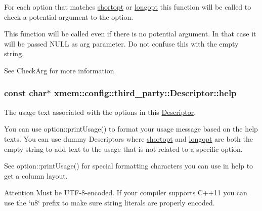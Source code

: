 For each option that matches \hyperlink{structxmem_1_1config_1_1third__party_1_1_descriptor_ac2dfb6bb8ca2f4aabf964a910cf0d59b}{shortopt} or \hyperlink{structxmem_1_1config_1_1third__party_1_1_descriptor_a7246a4bfc669f68bb406dece398be7bb}{longopt} this function will be called to check a potential argument to the option. 

This function will be called even if there is no potential argument. In that case it will be passed {\ttfamily N\+U\+L\+L} as {\ttfamily arg} parameter. Do not confuse this with the empty string.

See Check\+Arg for more information. \hypertarget{structxmem_1_1config_1_1third__party_1_1_descriptor_a099340907003981132a053856dac0eaa}{}
\subsubsection[{help}]{\setlength{\rightskip}{0pt plus 5cm}const char$\ast$ xmem\+::config\+::third\+\_\+party\+::\+Descriptor\+::help}\label{structxmem_1_1config_1_1third__party_1_1_descriptor_a099340907003981132a053856dac0eaa}


The usage text associated with the options in this \hyperlink{structxmem_1_1config_1_1third__party_1_1_descriptor}{Descriptor}. 

You can use option\+::print\+Usage() to format your usage message based on the {\ttfamily help} texts. You can use dummy Descriptors where \hyperlink{structxmem_1_1config_1_1third__party_1_1_descriptor_ac2dfb6bb8ca2f4aabf964a910cf0d59b}{shortopt} and \hyperlink{structxmem_1_1config_1_1third__party_1_1_descriptor_a7246a4bfc669f68bb406dece398be7bb}{longopt} are both the empty string to add text to the usage that is not related to a specific option.

See option\+::print\+Usage() for special formatting characters you can use in {\ttfamily help} to get a column layout.

\begin{DoxyAttention}{Attention}
Must be U\+T\+F-\/8-\/encoded. If your compiler supports C++11 you can use the \char`\"{}u8\char`\"{} prefix to make sure string literals are properly encoded. 
\end{DoxyAttention}
\hypertarget{structxmem_1_1config_1_1third__party_1_1_descriptor_aacf3d44f35c61f22be65da078f60734b}{}
